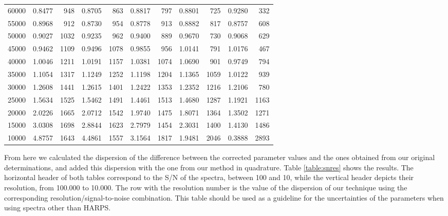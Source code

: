 \documentclass{aa}
\begin{document}
\begin{table}[]
\begin{center}
{{\begin{tabular}{l | r r | r r | r r | r r | r r}
60000 & 0.8477 & 948 & 0.8705 & 863 & 0.8817 & 797 & 0.8801 & 725 & 0.9280 & 332 \\
55000 & 0.8968 & 912 & 0.8730 & 954 & 0.8778 & 913 & 0.8882 & 817 & 0.8757 & 608 \\
50000 & 0.9027 & 1032 & 0.9235 & 962 & 0.9400 & 889 & 0.9670 & 730 & 0.9068 & 629 \\
45000 & 0.9462 & 1109 & 0.9496 & 1078 & 0.9855 & 956 & 1.0141 & 791 & 1.0176 & 467 \\
40000 & 1.0046 & 1211 & 1.0191 & 1157 & 1.0381 & 1074 & 1.0690 & 901 & 0.9749 & 794 \\
35000 & 1.1054 & 1317 & 1.1249 & 1252 & 1.1198 & 1204 & 1.1365 & 1059 & 1.0122 & 939 \\
30000 & 1.2608 & 1441 & 1.2615 & 1401 & 1.2422 & 1353 & 1.2352 & 1216 & 1.2106 & 780 \\
25000 & 1.5634 & 1525 & 1.5462 & 1491 & 1.4461 & 1513 & 1.4680 & 1287 & 1.1921 & 1163 \\
20000 & 2.0226 & 1665 & 2.0712 & 1542 & 1.9740 & 1475 & 1.8071 & 1364 & 1.3502 & 1271 \\
15000 & 3.0308 & 1698 & 2.8844 & 1623 & 2.7979 & 1454 & 2.3031 & 1400 & 1.4130 & 1486 \\
10000 & 4.8757 & 1643 & 4.4861 & 1557 & 3.1564 & 1817 & 1.9481 & 2046 & 0.3888 & 2893 \\
\hline
\end{tabular}
}}
\end{center}
\end{table}

From here we calculated the dispersion of the difference between the corrected parameter values and the ones obtained from our original determinations, and added this dispersion with the one from our method in quadrature. Table \ref{table:snres} shows the results. The horizontal header of both tables correspond to the S/N of the spectra, between 100 and 10,  while the vertical header depicts their resolution, from 100.000 to 10.000. The row with the resolution number is the value of the dispersion of our technique using the corresponding resolution/signal-to-noise combination. This table should be used as a guideline for the uncertainties of the parameters when using spectra other than HARPS.
\end{document}
